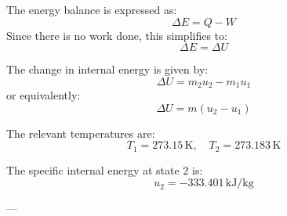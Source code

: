 The energy balance is expressed as:  
\[
\Delta E = Q - W
\]  
Since there is no work done, this simplifies to:  
\[
\Delta E = \Delta U
\]  

The change in internal energy is given by:  
\[
\Delta U = m_2 u_2 - m_1 u_1
\]  
or equivalently:  
\[
\Delta U = m (u_2 - u_1)
\]  

The relevant temperatures are:  
\[
T_1 = 273.15 \, \text{K}, \quad T_2 = 273.183 \, \text{K}
\]  

The specific internal energy at state 2 is:  
\[
u_2 = -333.401 \, \text{kJ/kg}
\]  

---